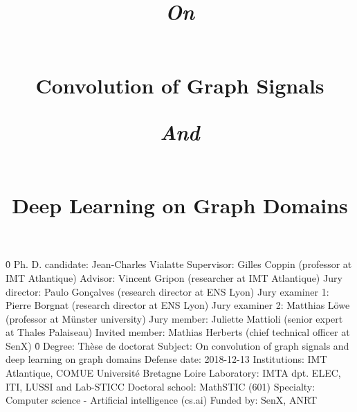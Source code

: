 \documentclass[12pt]{book}
\begin{document}

%
%



%
%

\pagestyle{empty}
\newline
\newline
\h{0}\newline
Ph. D. candidate: Jean-Charles Vialatte\newline
Supervisor: Gilles Coppin (professor at IMT Atlantique)\newline
Advisor: Vincent Gripon (researcher at IMT Atlantique)\newline
Jury director: Paulo Gonçalves (research director at ENS Lyon)\newline
Jury examiner 1: Pierre Borgnat (research director at ENS Lyon)\newline
Jury examiner 2: Matthias Löwe (professor at Münster university)\newline
Jury member: Juliette Mattioli (senior expert at Thales Palaiseau)\newline
Invited member: Mathias Herberts (chief technical officer at SenX)\newline
\h{0}\newline
Degree: Thèse de doctorat\newline
Subject: On convolution of graph signals and deep learning on graph domains\newline
Defense date: 2018-12-13\newline
Institutions: IMT Atlantique, COMUE Université Bretagne Loire\newline
Laboratory: IMTA dpt. ELEC, ITI, LUSSI and Lab-STICC\newline
Doctoral school: MathSTIC (601)\newline
Specialty: Computer science - Artificial intelligence (cs.ai)\newline
Funded by: SenX, ANRT


%

%
%

\title{\begin{large}\emph{On}\end{large}\\Convolution of Graph Signals\\\begin{large}\emph{And}\end{large}\\Deep Learning on Graph Domains}
\date{}
\maketitle
\end{document}
